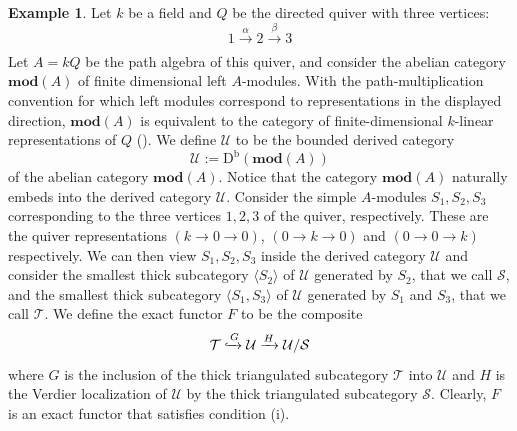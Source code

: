 \documentclass[11pt,reqno,a4paper]{amsart}
\theoremstyle{definition}
\newtheorem{example}[theorem]{Example}
\theoremstyle{remark}
\newcommand{\T}{\mathcal{T}}
\renewcommand{\S}{\mathcal{S}}
\newcommand{\U}{\mathcal{U}}
\newcommand{\0}{\mathbf{0}}
\renewcommand{\1}{\mathbf{1}}
\renewcommand{\mod}{\mathbf{mod}}
\newcommand{\aar}[2][]{\xrightarrow[#1]{#2}}
\begin{document}
\begin{example}
    Let $k$ be a field and $Q$ be the directed quiver with three vertices:
    $$1 \aar{\alpha} 2 \aar{\beta} 3$$
    Let $A = kQ$ be the path algebra of this quiver, and consider the abelian category $\mod(A)$ of finite dimensional left $A$-modules. With the path-multiplication convention for which left modules correspond to representations in the displayed direction, $\mod(A)$ is equivalent to the category of finite-dimensional $k$-linear representations of $Q$ (\cite[Chapter III]{ASS}). We define $\U$ to be the bounded derived category
    $$\U:=\operatorname{D^b}(\mod(A))$$
    of the abelian category $\mod(A)$. Notice that the category $\mod(A)$ naturally embeds into the derived category $\U$. Consider the simple $A$-modules $S_1,S_2,S_3$ corresponding to the three vertices $1,2,3$ of the quiver, respectively. These are the quiver representations $(k \to 0 \to 0)$, $(0 \to k \to 0)$ and $(0 \to 0 \to k)$ respectively. We can then view $S_1, S_2, S_3$ inside the derived category $\U$ and consider the smallest thick subcategory $\langle S_2 \rangle$ of $\U$ generated by $S_2$, that we call $\S$, and the smallest thick subcategory $\langle S_1, S_3 \rangle$ of $\U$ generated by $S_1$ and $S_3$, that we call $\T$. We define the exact functor $F$ to be the composite
    $$\T\xhookrightarrow{G} \U \aar{H} \U/\S$$
    where $G$ is the inclusion of the thick triangulated subcategory $\T$ into $\U$ and $H$ is the Verdier localization of $\U$ by the thick triangulated subcategory $\S$. Clearly, $F$ is an exact functor that satisfies condition (i).


\end{example}
\end{document}
